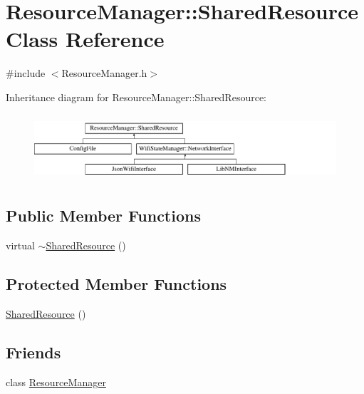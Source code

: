 \hypertarget{classResourceManager_1_1SharedResource}{}\section{Resource\+Manager\+:\+:Shared\+Resource Class Reference}
\label{classResourceManager_1_1SharedResource}


{\ttfamily \#include $<$Resource\+Manager.\+h$>$}

Inheritance diagram for Resource\+Manager\+:\+:Shared\+Resource\+:\begin{figure}[H]
\begin{center}
\leavevmode
\includegraphics[height=2.477876cm]{classResourceManager_1_1SharedResource}
\end{center}
\end{figure}
\subsection*{Public Member Functions}
\begin{DoxyCompactItemize}
\item 
virtual \mbox{\hyperlink{classResourceManager_1_1SharedResource_ac01059a60a6535bd525d0088c0adc4ee}{$\sim$\+Shared\+Resource}} ()
\end{DoxyCompactItemize}
\subsection*{Protected Member Functions}
\begin{DoxyCompactItemize}
\item 
\mbox{\hyperlink{classResourceManager_1_1SharedResource_a9d6f522ec518d3fb7b357ca63f6f5930}{Shared\+Resource}} ()
\end{DoxyCompactItemize}
\subsection*{Friends}
\begin{DoxyCompactItemize}
\item 
class \mbox{\hyperlink{classResourceManager_1_1SharedResource_a54c1252abc87a78a301e6b6984470408}{Resource\+Manager}}
\end{DoxyCompactItemize}


